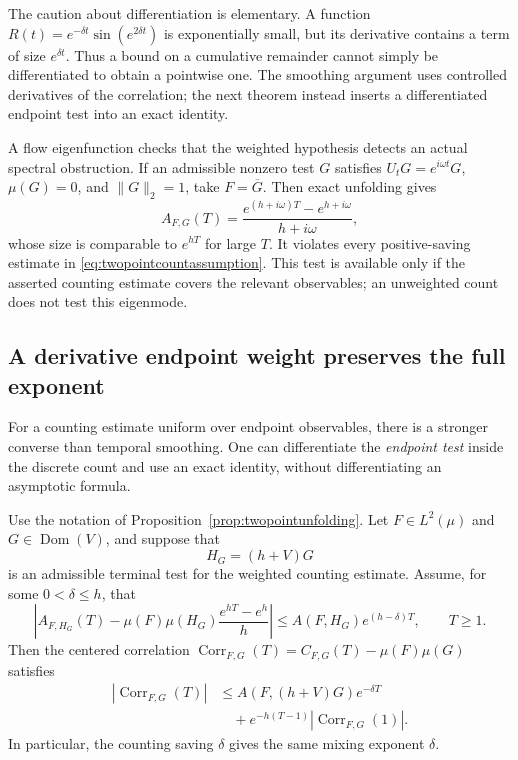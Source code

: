 The caution about differentiation is elementary. A function
$R(t)=e^{-\delta t}\sin(e^{2\delta t})$ is exponentially small,
but its derivative contains a term of size $e^{\delta t}$.
Thus a bound on a cumulative remainder cannot simply be
differentiated to obtain a pointwise one. The smoothing argument
uses controlled derivatives of the correlation; the next theorem
instead inserts a differentiated endpoint test into an exact identity.

A flow eigenfunction checks that the weighted hypothesis detects an
actual spectral obstruction. If an admissible nonzero test $G$ satisfies
$U_tG=e^{i\omega t}G$, $\mu(G)=0$, and $\|G\|_2=1$, take
$F=\overline G$. Then exact unfolding gives
\[
 A_{F,G}(T)
 =\frac{e^{(h+i\omega)T}-e^{h+i\omega}}{h+i\omega},
\]
whose size is comparable to $e^{hT}$ for large $T$. It violates
every positive-saving estimate in
\eqref{eq:twopointcountassumption}. This test is available only if
the asserted counting estimate covers the relevant observables;
an unweighted count does not test this eigenmode.

\subsection{A derivative endpoint weight preserves the full exponent}
\label{subsec:twopointderivativeweight}

For a counting estimate uniform over endpoint observables, there is
a stronger converse than temporal smoothing. One can differentiate
the \emph{endpoint test} inside the discrete count and use an exact
identity, without differentiating an asymptotic formula.

\begin{theorem}
\label{thm:twopointfullrate}
Use the notation of Proposition~\ref{prop:twopointunfolding}. Let
$F\in L^2(\mu)$ and $G\in\operatorname{Dom}(V)$, and suppose that
\[
 H_G=(h+V)G
\]
is an admissible terminal test for the weighted counting estimate.
Assume, for some $0<\delta\leq h$, that
\begin{equation}
 \left| A_{F,H_G}(T)
       -\mu(F)\mu(H_G)\frac{e^{hT}-e^h}{h}\right|
 \leq A(F,H_G)e^{(h-\delta)T},\qquad T\geq1.
 \label{eq:twopointderivativecount}
\end{equation}
Then the centered correlation
$\operatorname{Corr}_{F,G}(T)=C_{F,G}(T)-\mu(F)\mu(G)$ satisfies
\begin{equation}
 \begin{split}
 |\operatorname{Corr}_{F,G}(T)|
 &\leq A(F,(h+V)G)e^{-\delta T}\\
 &\quad+e^{-h(T-1)}
       |\operatorname{Corr}_{F,G}(1)|.
 \end{split}
 \label{eq:twopointfullrate}
\end{equation}
In particular, the counting saving $\delta$ gives the same
mixing exponent $\delta$.
\end{theorem}

